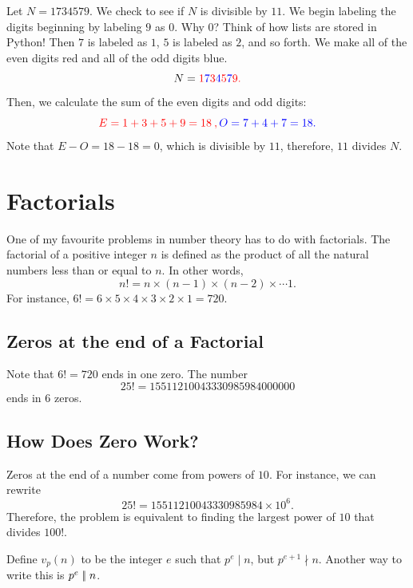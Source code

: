 Let $N=1734579.$ We check to see if $N$ is divisible by $11$. We begin labeling the digits beginning by labeling $9$ as $0$. Why $0$? Think of how lists are stored in Python! Then $7$ is labeled as $1$, $5$ is labeled as $2$, and so forth. We make all of the \color{red} even \color{black} digits red and all of the \color{blue} odd \color{black} digits blue.
$$N=\color{red}1\color{blue}7\color{red}3\color{blue}4\color{red}5\color{blue}7\color{red}9.$$ Then, we calculate the sum of the even digits and odd digits: $$\color{red} E=1+3+5+9=18\:, \color{blue}O=7+4+7=18.$$ Note that $E-O=18-18=0$, which is divisible by $11$, therefore, $11$ divides $N$.  

\section{Factorials}

One of my favourite problems in number theory has to do with factorials. The factorial of a positive integer $n$ is defined as the product of all the natural numbers less than or equal to $n$. In other words, $$n!=n\times (n-1)\times (n-2)\times \cdots 1.$$  For instance, $6!=6\times 5\times 4\times 3\times 2\times 1=720$.

\subsection{Zeros at the end of a Factorial}

Note that $6!=720$ ends in one zero.  The number $$25!=15511210043330985984000000$$ ends in $6$ zeros. 

\clearpage 

\subsection*{How Does Zero Work?}

Zeros at the end of a number come from powers of $10$.  For instance, we can rewrite $$25!=15511210043330985984\times 10^6.$$  
Therefore, the problem is equivalent to finding the largest power of $10$ that divides $100!$.  \begin{defi}  Define $v_p(n)$ to be the integer $e$ such that $p^e\mid n$, but $p^{e+1}\nmid n$. Another way to write this is $p^e\mid\!\mid n$. \end{defi} 

